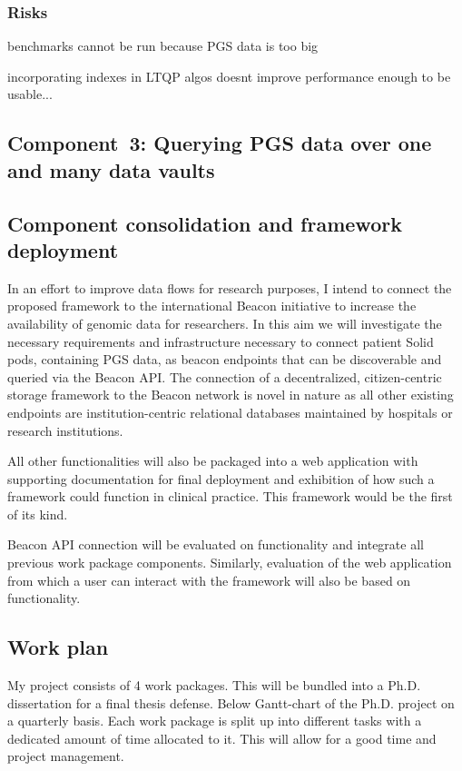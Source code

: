 \documentclass[a4paper,11pt]{article}
\begin{document}
\begin{refsection}
\subsubsection{Risks}

benchmarks cannot be run because PGS data is too big

incorporating indexes in LTQP algos doesnt improve performance enough to be usable...



\newcommand\WPd{Querying PGS data over one and many data vaults}
\subsection{Component~3: \WPd}
\subsection{Component consolidation and framework deployment}

In an effort to improve data flows for research purposes, I intend to connect the proposed framework to the international Beacon initiative \cite{rambla_beacon_2022} to increase the availability of genomic data for researchers. 
In this aim we will investigate the necessary requirements and infrastructure necessary to connect patient Solid pods, containing PGS data, as beacon endpoints that can be discoverable and queried via the Beacon API. 
The connection of a decentralized, citizen-centric storage framework to the Beacon network is novel in nature as all other existing endpoints are institution-centric relational databases maintained by hospitals or research institutions.

All other functionalities will also be packaged into a web application with supporting documentation for final deployment and exhibition of how such a framework could function in clinical practice.
This framework would be the first of its kind.

Beacon API connection will be evaluated on functionality and integrate all previous work package components. 
Similarly, evaluation of the web application from which a user can interact with the framework will also be based on functionality.

\subsection{Work plan}
\smallskip

\noindent
My project consists of 4 work packages. 
This will be bundled into a Ph.D. dissertation for a final thesis defense.
Below Gantt-chart of the Ph.D. project on a quarterly basis.  
Each work package is split up into different tasks with a dedicated amount of time allocated to it. 
This will allow for a good time and project management. 


\end{refsection}
\end{document}
